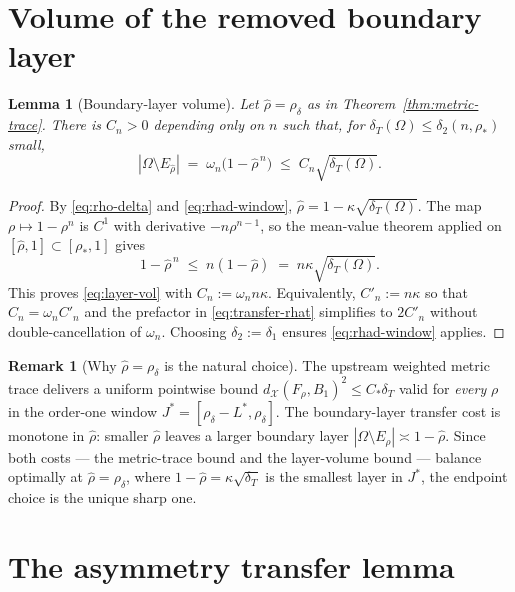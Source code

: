 \documentclass[11pt]{article}
\newtheorem{lemma}[theorem]{Lemma}
\theoremstyle{definition}
\newtheorem{remark}[theorem]{Remark}
\newcommand{\Om}{\Omega}
\newcommand{\rstar}{\rho_{*}}
\newcommand{\rhad}{\widehat\rho}
\newcommand{\X}{\mathcal X}
\begin{document}
\section{Volume of the removed boundary layer}\label{sec:layer-volume}

\begin{lemma}[Boundary-layer volume]\label{lem:layer-vol}
Let $\rhad=\rho_\delta$ as in Theorem~\ref{thm:metric-trace}. There is
$C_n>0$ depending only on $n$ such that, for
$\delta_T(\Om)\le\delta_2(n,\rstar)$ small,
\begin{equation}\label{eq:layer-vol}
|\Om\setminus E_{\rhad}|\;=\;\omega_n\bigl(1-\rhad^{\,n}\bigr)
\;\le\; C_n\sqrt{\delta_T(\Om)}.
\end{equation}
\end{lemma}

\begin{proof}
By \eqref{eq:rho-delta} and \eqref{eq:rhad-window},
$\rhad=1-\kappa\sqrt{\delta_T(\Om)}$.  The map $\rho\mapsto 1-\rho^n$ is
$C^1$ with derivative $-n\rho^{n-1}$, so the mean-value theorem applied
on $[\rhad,1]\subset[\rstar,1]$ gives
\[
   1-\rhad^{\,n}\;\le\;n(1-\rhad)\;=\;n\kappa\sqrt{\delta_T(\Om)}.
\]
This proves \eqref{eq:layer-vol} with $C_n:=\omega_n n\kappa$.
Equivalently, $C'_n:=n\kappa$ so that $C_n=\omega_n C'_n$ and the
prefactor in \eqref{eq:transfer-rhat} simplifies to $2C'_n$ without
double-cancellation of $\omega_n$.  Choosing $\delta_2:=\delta_1$
ensures \eqref{eq:rhad-window} applies.
\end{proof}

\begin{remark}[Why $\rhad=\rho_\delta$ is the natural choice]
\label{rem:why-rho-delta}
The upstream weighted metric trace
\cite[Thm.~5.6, Rem.~5.7]{WeightedMetricTrace} delivers a uniform
pointwise bound $d_\X(F_\rho,B_1)^2\le C_*\delta_T$ valid for
\emph{every} $\rho$ in the order-one window $J^*=[\rho_\delta-L^*,\rho_\delta]$.
The boundary-layer transfer cost is monotone in $\rhad$: smaller
$\rhad$ leaves a larger boundary layer
$|\Om\setminus E_{\rhad}|\asymp 1-\rhad$.  Since both costs --- the
metric-trace bound and the layer-volume bound --- balance optimally at
$\rhad=\rho_\delta$, where $1-\rhad=\kappa\sqrt{\delta_T}$ is the
smallest layer in $J^*$, the endpoint choice is the unique sharp one.
\end{remark}

\section{The asymmetry transfer lemma}\label{sec:transfer}
\end{document}
